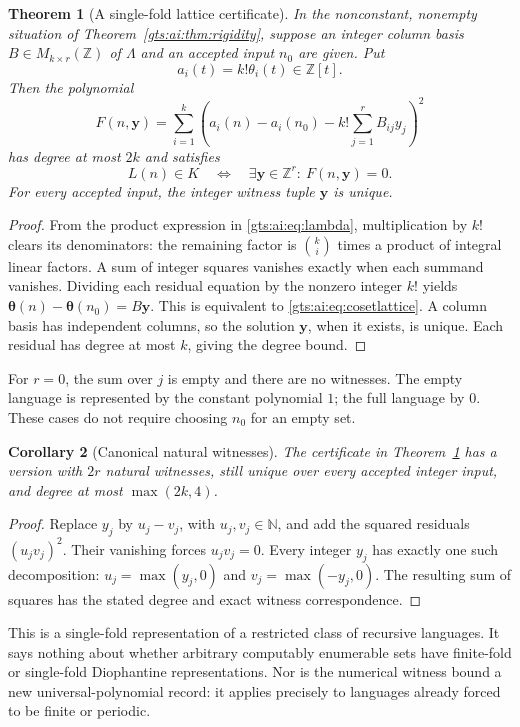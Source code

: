 \documentclass[11pt,letterpaper]{article}
\newtheorem{theorem}{Theorem}[section]
\newtheorem{corollary}[theorem]{Corollary}
\theoremstyle{definition}
\theoremstyle{remark}
\newcommand{\Z}{\mathbb Z}
\newcommand{\N}{\mathbb N}
\newcommand{\vv}{\boldsymbol\theta}
\begin{document}
\begin{theorem}[A single-fold lattice certificate]\label{gts:ai:thm:certificate}
In the nonconstant, nonempty situation of Theorem~\ref{gts:ai:thm:rigidity}, suppose an integer column basis
$B\in M_{k\times r}(\Z)$ of $\Lambda$ and an accepted input $n_0$ are given. Put
\[
 a_i(t)=k!\theta_i(t)\in\Z[t].
\]
Then the polynomial
\begin{equation}\label{gts:ai:eq:certificate}
 F(n,\mathbf y)=\sum_{i=1}^k
 \left(a_i(n)-a_i(n_0)-k!\sum_{j=1}^rB_{ij}y_j\right)^2
\end{equation}
has degree at most $2k$ and satisfies
\[
 L(n)\in K\quad\Longleftrightarrow\quad
 \exists\mathbf y\in\Z^r:\ F(n,\mathbf y)=0.
\]
For every accepted input, the integer witness tuple $\mathbf y$ is unique.
\end{theorem}
\begin{proof}
From the product expression in \eqref{gts:ai:eq:lambda}, multiplication by $k!$ clears its denominators: the remaining factor is $\binom ki$ times a product of integral linear factors. A sum of integer squares vanishes exactly when each summand vanishes. Dividing each residual equation by the nonzero integer $k!$ yields
$\vv(n)-\vv(n_0)=B\mathbf y$. This is equivalent to \eqref{gts:ai:eq:cosetlattice}. A column basis has independent columns, so the solution $\mathbf y$, when it exists, is unique. Each residual has degree at most $k$, giving the degree bound.
\end{proof}
For $r=0$, the sum over $j$ is empty and there are no witnesses. The empty language is represented by the constant polynomial $1$; the full language by $0$. These cases do not require choosing $n_0$ for an empty set.

\begin{corollary}[Canonical natural witnesses]\label{gts:ai:cor:natural}
The certificate in Theorem~\ref{gts:ai:thm:certificate} has a version with $2r$ natural witnesses, still unique over every accepted integer input, and degree at most $\max(2k,4)$.
\end{corollary}
\begin{proof}
Replace $y_j$ by $u_j-v_j$, with $u_j,v_j\in\N$, and add the squared residuals $(u_jv_j)^2$. Their vanishing forces $u_jv_j=0$. Every integer $y_j$ has exactly one such decomposition:
$u_j=\max(y_j,0)$ and $v_j=\max(-y_j,0)$. The resulting sum of squares has the stated degree and exact witness correspondence.
\end{proof}
This is a single-fold representation of a restricted class of recursive languages. It says nothing about whether arbitrary computably enumerable sets have finite-fold or single-fold Diophantine representations. Nor is the numerical witness bound a new universal-polynomial record: it applies precisely to languages already forced to be finite or periodic.
\end{document}
